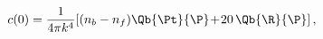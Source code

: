 \begin{equation}
c(0)=\frac1{4\pi k^4}\!\left[\left(n_b-n_f\right)\!
\Qb{\Pt}{\P}\!+\!20\,\Qb{\R}{\P}\right],
\end{equation}

